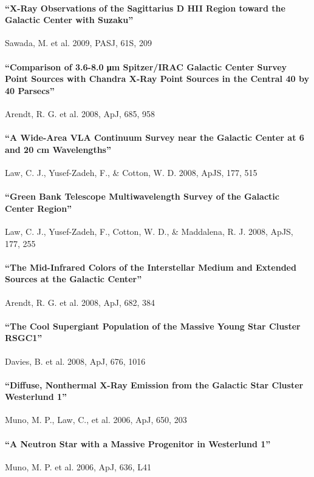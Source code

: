 \documentclass[12pt]{article}
\begin{document}
\paragraph{``X-Ray Observations of the Sagittarius D HII Region toward the Galactic Center with Suzaku''} Sawada, M. et al. 2009, PASJ, 61S, 209

\paragraph{``Comparison of 3.6-8.0 μm Spitzer/IRAC Galactic Center Survey Point Sources with Chandra X-Ray Point Sources in the Central 40 by 40 Parsecs''} Arendt, R. G. et al. 2008, ApJ, 685, 958

\paragraph{``A Wide-Area VLA Continuum Survey near the Galactic Center at 6 and 20 cm Wavelengths''} Law, C. J., Yusef-Zadeh, F., \& Cotton, W. D. 2008, ApJS, 177, 515

\paragraph{``Green Bank Telescope Multiwavelength Survey of the Galactic Center Region''} Law, C. J., Yusef-Zadeh, F., Cotton, W. D., \& Maddalena, R. J. 2008, ApJS, 177, 255

\paragraph{``The Mid-Infrared Colors of the Interstellar Medium and Extended Sources at the Galactic Center''} Arendt, R. G. et al. 2008, ApJ, 682, 384

\paragraph{``The Cool Supergiant Population of the Massive Young Star Cluster RSGC1''} Davies, B. et al. 2008, ApJ, 676, 1016

\paragraph{``Diffuse, Nonthermal X-Ray Emission from the Galactic Star Cluster Westerlund 1''} Muno, M. P., Law, C., et al. 2006, ApJ, 650, 203

\paragraph{``A Neutron Star with a Massive Progenitor in Westerlund 1''} Muno, M. P. et al. 2006, ApJ, 636, L41
\end{document}
